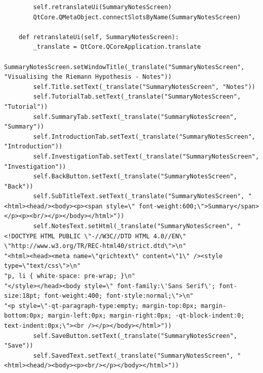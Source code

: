 \documentclass{article}
\begin{document}
\begin{lstlisting}
        self.retranslateUi(SummaryNotesScreen)
        QtCore.QMetaObject.connectSlotsByName(SummaryNotesScreen)

    def retranslateUi(self, SummaryNotesScreen):
        _translate = QtCore.QCoreApplication.translate
        SummaryNotesScreen.setWindowTitle(_translate("SummaryNotesScreen", "Visualising the Riemann Hypothesis - Notes"))
        self.Title.setText(_translate("SummaryNotesScreen", "Notes"))
        self.TutorialTab.setText(_translate("SummaryNotesScreen", "Tutorial"))
        self.SummaryTab.setText(_translate("SummaryNotesScreen", "Summary"))
        self.IntroductionTab.setText(_translate("SummaryNotesScreen", "Introduction"))
        self.InvestigationTab.setText(_translate("SummaryNotesScreen", "Investigation"))
        self.BackButton.setText(_translate("SummaryNotesScreen", "Back"))
        self.SubTitleText.setText(_translate("SummaryNotesScreen", "<html><head/><body><p><span style=\" font-weight:600;\">Summary</span></p><p><br/></p></body></html>"))
        self.NotesText.setHtml(_translate("SummaryNotesScreen", "<!DOCTYPE HTML PUBLIC \"-//W3C//DTD HTML 4.0//EN\" \"http://www.w3.org/TR/REC-html40/strict.dtd\">\n"
"<html><head><meta name=\"qrichtext\" content=\"1\" /><style type=\"text/css\">\n"
"p, li { white-space: pre-wrap; }\n"
"</style></head><body style=\" font-family:\'Sans Serif\'; font-size:18pt; font-weight:400; font-style:normal;\">\n"
"<p style=\"-qt-paragraph-type:empty; margin-top:0px; margin-bottom:0px; margin-left:0px; margin-right:0px; -qt-block-indent:0; text-indent:0px;\"><br /></p></body></html>"))
        self.SaveButton.setText(_translate("SummaryNotesScreen", "Save"))
        self.SavedText.setText(_translate("SummaryNotesScreen", "<html><head/><body><p><br/></p></body></html>"))
\end{lstlisting}
\end{document}
